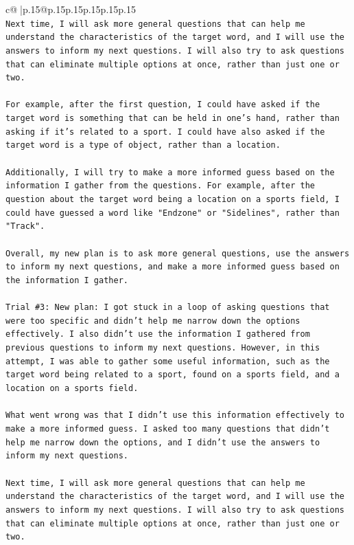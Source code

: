 \documentclass{article}
\begin{document}
{\begin{supertabular}{c@{$\;$}|p{.15\linewidth}@{}p{.15\linewidth}p{.15\linewidth}p{.15\linewidth}p{.15\linewidth}p{.15\linewidth}}
{{{\\ 
\texttt{Next time, I will ask more general questions that can help me understand the characteristics of the target word, and I will use the answers to inform my next questions. I will also try to ask questions that can eliminate multiple options at once, rather than just one or two. } \\
\\ 
\texttt{For example, after the first question, I could have asked if the target word is something that can be held in one's hand, rather than asking if it's related to a sport. I could have also asked if the target word is a type of object, rather than a location. } \\
\\ 
\texttt{Additionally, I will try to make a more informed guess based on the information I gather from the questions. For example, after the question about the target word being a location on a sports field, I could have guessed a word like "Endzone" or "Sidelines", rather than "Track". } \\
\\ 
\texttt{Overall, my new plan is to ask more general questions, use the answers to inform my next questions, and make a more informed guess based on the information I gather.} \\
\\ 
\texttt{Trial \#3: New plan: I got stuck in a loop of asking questions that were too specific and didn't help me narrow down the options effectively. I also didn't use the information I gathered from previous questions to inform my next questions. However, in this attempt, I was able to gather some useful information, such as the target word being related to a sport, found on a sports field, and a location on a sports field. } \\
\\ 
\texttt{What went wrong was that I didn't use this information effectively to make a more informed guess. I asked too many questions that didn't help me narrow down the options, and I didn't use the answers to inform my next questions. } \\
\\ 
\texttt{Next time, I will ask more general questions that can help me understand the characteristics of the target word, and I will use the answers to inform my next questions. I will also try to ask questions that can eliminate multiple options at once, rather than just one or two. } \\
\\ 
}}}
\end{supertabular}}
\end{document}
